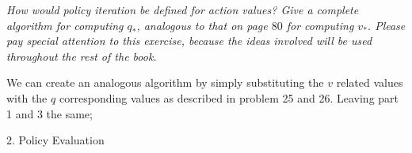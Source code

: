\documentclass[12pt,letterpaper]{exam}
\begin{document}
\begin{questions}
	\emph{How would policy iteration be defined for action values? Give a complete algorithm for computing 
	\(q_*\), analogous to that on page \(80\) for computing \(v_*\). 
	Please pay special attention to this exercise, because the ideas involved will be used throughout the rest of the book.}
	\begin{solution}
		We can create an analogous algorithm by simply substituting the \(v\) related values with the \(q\) corresponding values
		as described in problem 25 and 26. Leaving part 1 and 3 the same;\\
		\begin{algorithm}[H]
			2. Policy Evaluation \\
		\end{algorithm}
	\end{solution}


\end{questions}
\end{document}
